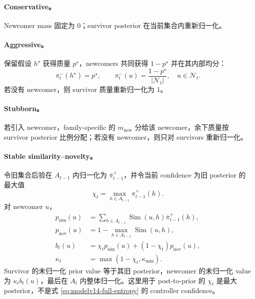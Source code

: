 \paragraph{Conservative。}
Newcomer mass 固定为 0；survivor posterior 在当前集合内重新归一化。

\paragraph{Aggressive。}
保留假设 $h^\star$ 获得质量 $p^\star$，newcomers 共同获得 $1-p^\star$ 并在其内部均分：
\begin{equation}
    \pi_t^-(h^\star)=p^\star,
    \qquad
    \pi_t^-(u)
    =
    \frac{1-p^\star}{|\mathcal N_t|},
    \quad u\in\mathcal N_t.
    \label{eq:modelv14-aggressive-prior}
\end{equation}
若没有 newcomer，则 survivor 质量重新归一化为 1。

\paragraph{Stubborn。}
若引入 newcomer，family-specific 的 $m_{\mathrm{new}}$ 分给该 newcomer，余下质量按 survivor posterior 比例分配；若没有 newcomer，则只对 survivors 重新归一化。

\paragraph{Stable similarity--novelty。}
令旧集合后验在 $A_{t-1}$ 内归一化为 $\bar\pi_{t-1}^{+}$，并令当前 confidence 为旧 posterior 的最大值
\begin{equation}
    \chi_t
    =
    \max_{h\in A_{t-1}}\pi_{t-1}^{+}(h).
    \label{eq:modelv14-stable-confidence}
\end{equation}
对 newcomer $u$，
\begin{align}
    p_{\mathrm{sim}}(u)
    &=
    \sum_{h\in A_{t-1}}
    \operatorname{Sim}(u,h)
    \bar\pi_{t-1}^{+}(h),\\
    p_{\mathrm{nov}}(u)
    &=
    1-
    \max_{h\in A_{t-1}}
    \operatorname{Sim}(u,h),\\
    b_t(u)
    &=
    \chi_t p_{\mathrm{sim}}(u)
    +(1-\chi_t)p_{\mathrm{nov}}(u),\\
    \kappa_t
    &=
    \max(1-\chi_t,\kappa_{\min}).
    \label{eq:modelv14-stable-newcomer}
\end{align}
Survivor 的未归一化 prior value 等于其旧 posterior，newcomer 的未归一化 value 为 $\kappa_t b_t(u)$，最后在 $A_t$ 内整体归一化。这里用于 post-to-prior 的 $\chi_t$ 是最大 posterior，不是式 \ref{eq:modelv14-full-entropy} 的 controller confidence。


